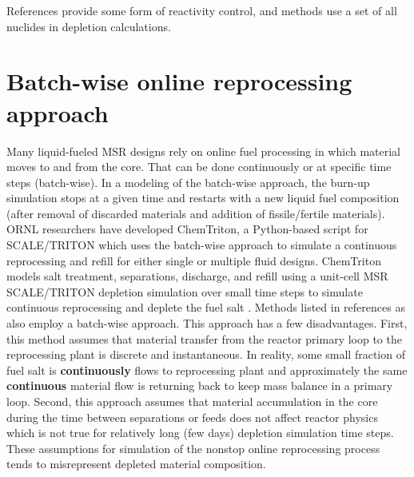 References \cite{li_optimization_2018,de_troullioud_de_lanversin_toward_2017,doligez_coupled_2014,
heuer_towards_2014, sheu_depletion_2013, aufiero_extended_2013} provide some form of reactivity control, 
and methods \cite{doligez_coupled_2014,heuer_towards_2014,aufiero_extended_2013,ahmad_neutronics_2015, 
park_whole_2015,jeong_equilibrium_2016,rykhlevskii_modeling_2019,nuttin_potential_2005} use a set of all nuclides in depletion calculations. 

\section{Batch-wise online reprocessing approach}
Many liquid-fueled \gls{MSR} designs rely on online fuel processing in which  
material moves to and from the core. That can be done continuously or at 
specific time steps (batch-wise). In a modeling of the batch-wise approach, 
the burn-up simulation stops at a given 
time and restarts with a new liquid fuel composition (after removal of discarded 
materials and addition of fissile/fertile materials). \gls{ORNL} researchers 
have developed ChemTriton, a Python-based script for SCALE/TRITON which uses the 
batch-wise approach to simulate a continuous reprocessing and refill for 
either single or multiple fluid designs. ChemTriton models salt 
treatment, separations, discharge, and refill using a unit-cell \gls{MSR} 
SCALE/TRITON depletion simulation over small time steps to simulate continuous 
reprocessing and deplete the fuel salt \cite{powers_new_2013}. Methods listed in 
references \cite{zhou_fuel_2018-1, sheu_depletion_2013,
park_whole_2015, jeong_equilibrium_2016, powers_inventory_2014,
betzler_molten_2017,rykhlevskii_modeling_2019} 
as also employ a batch-wise approach. This approach has a few disadvantages. 
First, this method assumes that material transfer from the reactor primary 
loop to the reprocessing plant is discrete and instantaneous. In reality, 
some small fraction of fuel salt is \textbf{continuously} flows to 
reprocessing plant and approximately the same \textbf{continuous} material flow 
is returning back to keep mass balance in a primary loop. Second, this approach 
assumes that material accumulation in the core 
during the time between separations or feeds does not affect reactor physics which 
is not true for relatively long (few days) depletion simulation time steps. 
These assumptions for simulation of the nonstop online reprocessing process 
tends to misrepresent depleted material composition.

